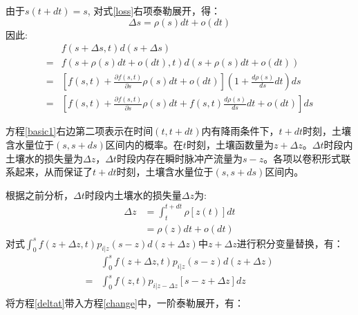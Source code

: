 由于$s(t+dt)= s$, 对式\ref{loss}右项泰勒展开，得：
\begin{equation}
\Delta s=\rho(s)dt+o(dt)
\end{equation}
因此:
\begin{equation}
\label{norain1}
\begin{split}
&f(s+\Delta s,t)d(s+\Delta s)\\=&f(s+\rho(s)dt+o(dt),t)d(s+\rho(s)dt+o(dt))
\\=&[f(s,t)+\frac{\partial{f(s,t)}}{\partial s}\rho(s)dt+o(dt)](1+\frac{d\rho(s)}{ds}dt)ds
\\=&[f(s,t)+\frac{\partial{f(s,t)}}{\partial s}\rho(s)dt+f(s,t)\frac{d\rho(s)}{ds}dt+o(dt)]ds
\end{split}
\end{equation}
 

 
 
方程\ref{basic1}右边第二项表示在时间$(t,t+dt)$内有降雨条件下，$t+dt$时刻，土壤含水量位于$(s,s+ds)$区间内的概率。在$t$时刻，土壤函数量为$z+\Delta z$。$\Delta t$时段内土壤水的损失量为$\Delta z$，$\Delta t$时段内存在瞬时脉冲产流量为$s-z$。各项以卷积形式联系起来，从而保证了$t+dt$时刻，土壤含水量位于$(s,s+ds)$区间内。

根据之前分析，$\Delta t$时段内土壤水的损失量$\Delta z$为:
\begin{equation}
\label{deltat}
\begin{split}
\Delta z&=\int_t^{t+dt} \rho[z(t)]dt\\&=\rho(z)dt+o(dt)
\end{split}
\end{equation} 
对式$\int_{0}^{s} f(z+\Delta z,t)p_{i|z}(s-z)d(z+\Delta z)$中$z+\Delta z$进行积分变量替换，有：
\begin{equation}
\label{change}
\begin{split}
 &\int_{0}^{s} f(z+\Delta z,t)p_{i|z}(s-z)d(z+\Delta z)\\
 =&\int_{0}^{s} f(z,t)p_{i|z-\Delta z}[s-z+\Delta z]dz\\
 \end{split}
\end{equation}
将方程\ref{deltat}带入方程\ref{change}中，一阶泰勒展开，有：

